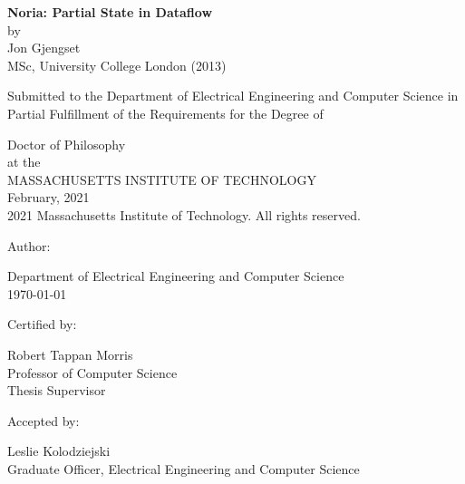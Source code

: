 \documentclass[fontsize=12pt,paper=letter]{scrartcl}
\begin{document}
\begin{titlepage}
  \begin{center}
    \textbf{\large Noria: Partial State in Dataflow}\\
    \vspace{0.5\baselineskip}
    by\\
    \vspace{0.5\baselineskip}
    {\large Jon Gjengset}\\
    \vspace{0.5\baselineskip}
    MSc, University College London (2013)\\
    \vspace{0.5\baselineskip}
    \begin{addmargin}[0.5in]{0.5in}
      \centering
      Submitted to the Department of
      Electrical Engineering and Computer Science
      in Partial Fulfillment of the Requirements for the Degree of\\
    \end{addmargin}
    \vspace{0.5\baselineskip}
    Doctor of Philosophy\\
    \vspace{0.5\baselineskip}
    at the\\
    \vspace{0.5\baselineskip}
    MASSACHUSETTS INSTITUTE OF TECHNOLOGY\\
    \vspace{0.5\baselineskip}
    February, 2021\\
    \vspace{0.5\baselineskip}
    \textcopyright{} 2021 Massachusetts Institute of Technology.
    All rights reserved.
  \end{center}

  \vspace{2\baselineskip}
  {
  \raggedright
  Author: \dotfill

  \raggedleft
  Department of Electrical Engineering and Computer Science\\
  \today{}\\
  }

  \vspace{2\baselineskip}
  {
  \raggedright
  Certified by: \dotfill

  \raggedleft
  Robert Tappan Morris\\
  Professor of Computer Science\\
  Thesis Supervisor\\
  }

  \vspace{2\baselineskip}
  {
  \raggedright
  Accepted by: \dotfill

  \raggedleft
  Leslie Kolodziejski\\
  Graduate Officer, Electrical Engineering and Computer Science\\
  }
\end{titlepage}
\end{document}
